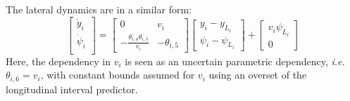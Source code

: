 \documentclass{article}
\begin{document}
The lateral dynamics are in a similar form:
\begin{equation*}
\begin{bmatrix}
\dot{y}_i \\
\dot{\psi}_i \\
\end{bmatrix}
=
\begin{bmatrix}
0 & v_i \\
-\frac{\theta_{i,4} \theta_{i,5}}{v_i} & -\theta_{i,5}
\end{bmatrix}
\begin{bmatrix}
y_i - y_{L_i} \\
\psi_i - \psi_{L_i}
\end{bmatrix}
+
\begin{bmatrix}
v_i\psi_{L_i} \\
0
\end{bmatrix}
\end{equation*}
Here, the dependency in $v_i$ is seen as an uncertain parametric dependency, \emph{i.e.} $\theta_{i,6}=v_i$, with constant bounds assumed for $v_i$ using an overset of the longitudinal interval predictor.
\end{document}
